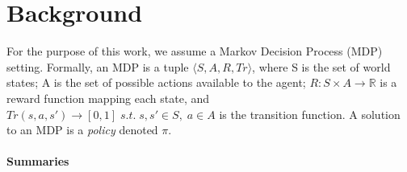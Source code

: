 \section{Background}
For the purpose of this work, we assume a Markov Decision Process (MDP) setting.
Formally, an MDP is a tuple $\langle S,A,R,Tr \rangle$, where S is the set of
world states; {A} is the set of possible actions available to the agent; $R:S
\times A \rightarrow \mathbb{R}$ is a reward function mapping each state, and
$Tr(s,a,s') \rightarrow [0,1] \; s.t. \; s,s' \in S, \; a\in A$ is the
transition function.
A solution to an MDP is a \emph{policy} denoted $\pi$. 


\paragraph{Summaries}



